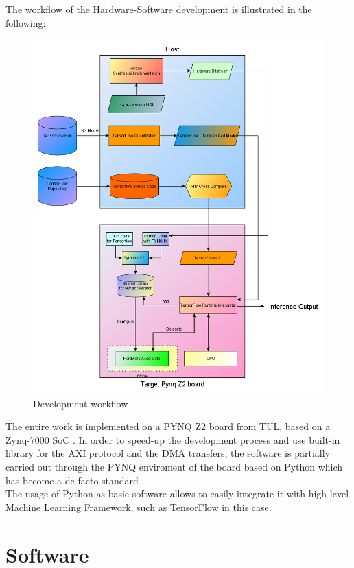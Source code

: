 \newpage
The workflow of the Hardware-Software development is illustrated in the following:
\begin{figure}[!htbp]
\centering
\captionsetup{justification=centering}
\includegraphics[scale=0.5]{./figure/workflow.png}
\caption{Development workflow}
\label{fig:workflow}
\end{figure}

\newpage
The entire work is implemented on a PYNQ Z2 board from TUL, based on a Zynq-7000 SoC \cite{paper:31}. In order to speed-up the development process and use built-in library for the AXI protocol and the DMA transfers, the software is partially carried out through the PYNQ enviroment of the board \cite{WEBSITE:2} based on Python which has become a de facto standard \cite{paper:37}. \\
The usage of Python as basic software allows to easily integrate it with high level Machine Learning Framework, such as TensorFlow in this case. 
\newpage
\section{Software}

